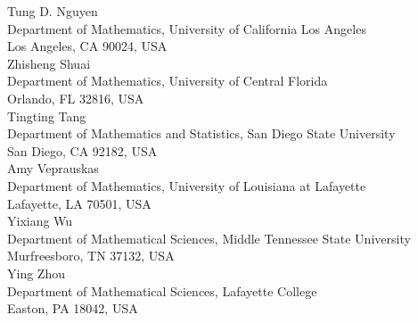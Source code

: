 \documentclass[11pt]{article}
\theoremstyle{definition}
\begin{document}


\maketitle


\vspace{-0.2cm}

\begin{center}{\large
Tung D. Nguyen\\[1mm]
Department of Mathematics, University of California Los Angeles\\
Los Angeles, CA 90024, USA\\[3mm]

Zhisheng Shuai\\[1mm]
Department of Mathematics, University of Central Florida\\
Orlando, FL 32816, USA\\[3mm]

Tingting Tang\\[1mm]
Department of Mathematics and Statistics, San Diego State University\\
San Diego, CA 92182, USA\\[3mm]


Amy Veprauskas\\[1mm]
Department of Mathematics, University of Louisiana at Lafayette\\
Lafayette, LA 70501, USA\\[3mm]


Yixiang Wu\\[1mm]
Department of Mathematical Sciences, Middle Tennessee State University\\
Murfreesboro, TN 37132, USA\\[3mm]

Ying Zhou\\[1mm]
Department of Mathematical Sciences, Lafayette College\\
Easton, PA 18042, USA
}
\end{center}
\end{document}
